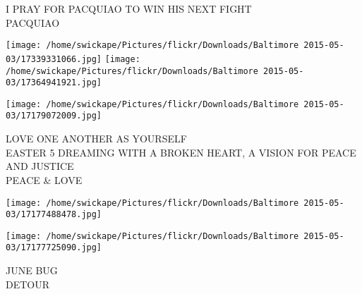 \documentclass[10pt,letterpaper]{article}
\begin{document}
I PRAY FOR PACQUIAO TO WIN HIS NEXT FIGHT\\
PACQUIAO\\
\pagebreak

\texttt{[image: /home/swickape/Pictures/flickr/Downloads/Baltimore 2015-05-03/17339331066.jpg]}
\texttt{[image: /home/swickape/Pictures/flickr/Downloads/Baltimore 2015-05-03/17364941921.jpg]}

\texttt{[image: /home/swickape/Pictures/flickr/Downloads/Baltimore 2015-05-03/17179072009.jpg]}

LOVE ONE ANOTHER AS YOURSELF\\
EASTER 5 DREAMING WITH A BROKEN HEART, A VISION FOR PEACE AND JUSTICE\\
PEACE \& LOVE\\
\pagebreak

\texttt{[image: /home/swickape/Pictures/flickr/Downloads/Baltimore 2015-05-03/17177488478.jpg]}

\vspace{0.25in}
\texttt{[image: /home/swickape/Pictures/flickr/Downloads/Baltimore 2015-05-03/17177725090.jpg]}

JUNE BUG\\
DETOUR\\
\pagebreak
\end{document}
